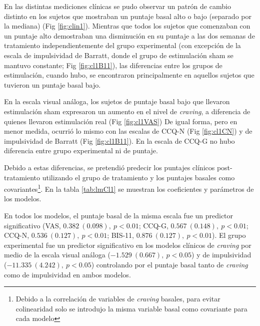 En las distintas mediciones clínicas se pudo observar un patrón de cambio distinto en los sujetos que mostraban un puntaje basal alto o bajo (separado por la mediana) (Fig \ref{fig:clin1}). Mientras que todos los sujetos que comenzaban con un puntaje alto demostraban una disminución en su puntaje a las dos semanas de tratamiento independientemente del grupo experimental (con excepción de la escala de impulsividad de Barratt, donde el grupo de estimulación sham se mantuvo constante; Fig \ref{fig:cl1B11}), las diferencias entre los grupos de estimulación, cuando hubo, se encontraron principalmente en aquellos sujetos que tuvieron un puntaje basal bajo. \par
En la escala visual análoga, los sujetos de puntaje basal bajo que llevaron estimulación sham expresaron un aumento en el nivel de \textit{craving}, a diferencia de quienes llevaron estimulación real (Fig \ref{fig:cl1VAS}) De igual forma, pero en menor medida, ocurrió lo mismo con las escalas de CCQ-N (Fig \ref{fig:cl1CN}) y de impulsividad de Barratt (Fig \ref{fig:cl1B11}). En la escala de CCQ-G no hubo diferencia entre grupo experimental ni de puntaje. \par

Debido a estas diferencias, se pretendió predecir los puntajes clínicos post-tratamiento utilizando el grupo de tratamiento y los puntajes basales como covariantes\footnote{Debido a la correlación de variables de \textit{craving} basales, para evitar colinearidad solo se introdujo la misma variable basal como covariante para cada modelo}. En la tabla \ref{tab:lmCl1} se muestran los coeficientes y parámetros de los modelos. \par
En todos los modelos, el puntaje basal de la misma escala fue un predictor significativo (VAS, $0.382\ (0.098),\ p<0.01$; CCQ-G, $0.567\ (0.148),\ p<0.01$; CCQ-N, $0.536\ (0.127),\ p<0.01$; BIS-11, $0.876\ (0.127),\ p<0.01$). El grupo experimental fue un predictor significativo en los modelos clínicos de \textit{craving} por medio de la escala visual análoga ($-1.529\ (0.667),\ p<0.05$) y de impulsividad ($-11.335\ (4.242),\ p<0.05$) controlando por el puntaje basal tanto de \textit{craving} como de impulsividad en ambos modelos.


